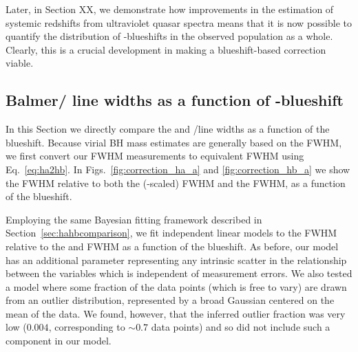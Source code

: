 Later, in Section XX, we demonstrate how improvements in the estimation of systemic redshifts from ultraviolet quasar spectra means that it is now possible to quantify the distribution of -blueshifts in the observed population as a whole. 
Clearly, this is a crucial development in making a blueshift-based correction viable.

\subsection{Balmer/ line widths as a function of -blueshift}
\label{sec:correction}

In this Section we directly compare the  and \hans/\hb line widths as a function of the  blueshift. 
Because virial BH mass estimates are generally based on the \hb FWHM, we first convert our \ha FWHM measurements to equivalent \hb FWHM using Eq.~\ref{eq:ha2hb}.  
In Figs.~\ref{fig:correction_ha_a} and \ref{fig:correction_hb_a} we show the  FWHM relative to both the (\hbns-scaled) \ha FWHM and the \hb FWHM, as a function of the  blueshift. 

Employing the same Bayesian fitting framework described in Section~\ref{sec:hahbcomparison}, we fit independent linear models to the  FWHM relative to the \ha and \hb FWHM as a function of the  blueshift. 
As before, our model has an additional parameter representing any intrinsic scatter in the relationship between the variables which is independent of measurement errors.  
We also tested a model where some fraction of the data points (which is free to vary) are drawn from an outlier distribution, represented by a broad Gaussian centered on the mean of the data. 
We found, however, that the inferred outlier fraction was very low ($0.004$, corresponding to $\sim0.7$ data points) and so did not include such a component in our model. 

